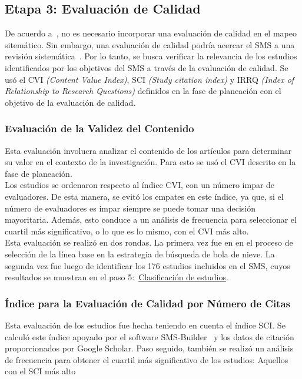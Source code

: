 \subsection{Etapa 3: Evaluación de Calidad}
De acuerdo a~\cite{8747000}, no es necesario incorporar una evaluación de calidad en el mapeo sitemático. Sin embargo, una evaluación de calidad podría acercar el SMS a una revisión sistemática~\cite{10.1145/2601248.2601268}. Por lo tanto, se busca verificar la relevancia de los estudios identificados por los objetivos del SMS a través de la evaluación de calidad. Se usó el CVI \textit{(Content Value Index)}, SCI \textit{(Study citation index)} y IRRQ \textit{(Index of Relationship to Research Questions)} definidos en la fase de planeación con el objetivo de la evaluación de calidad.
\mbox{}\\

\subsubsection{Evaluación de la Validez del Contenido}
Esta evaluación involucra analizar el contenido de los artículos para determinar su valor en el contexto de la investigación. Para esto se usó el CVI descrito en la fase de planeación. \\
Los estudios se ordenaron respecto al índice CVI, con un número impar de evaluadores. De esta manera, se evitó los empates en este índice, ya que, si el número de evaluadores es impar siempre se puede tomar una decisión mayoritaria. Además, esto conduce a un análisis de frecuencia para seleccionar el cuartil más significativo, o lo que es lo mismo, con el CVI más alto. \\
Esta evaluación se realizó en dos rondas. La primera vez fue en en el proceso de selección de la línea base en la estrategia de búsqueda de bola de nieve. La segunda vez fue luego de identificar los 176 estudios incluidos en el SMS, cuyos resultados se muestran en el paso 5:~\hyperref[sec:clasificacion-estudios]{Clasificación de estudios}.
\mbox{}\\

\subsubsection{Índice para la Evaluación de Calidad por Número de Citas}
Esta evaluación de los estudios fue hecha teniendo en cuenta el índice SCI. Se calculó este índice apoyado por el software SMS-Builder~\cite{candela2020smsbuilder} y los datos de citación proporcionados por Google Scholar. Paso seguido, también se realizó un análisis de frecuencia para obtener el cuartil más significativo de los estudios: Aquellos con el SCI más alto \\
\mbox{}\\

